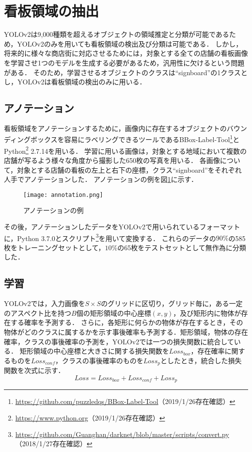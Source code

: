 \section{看板領域の抽出}
  YOLOv2は9,000種類を超えるオブジェクトの領域推定と分類が可能であるため，YOLOv2のみを用いても看板領域の検出及び分類は可能である．
  しかし，将来的に様々な商店街に対応させるためには，対象とする全ての店舗の看板画像を学習させ1つのモデルを生成する必要があるため，汎用性に欠けるという問題がある．
  そのため，学習させるオブジェクトのクラスは``signboard''の1クラスとし，YOLOv2は看板領域の検出のみに用いる．
  \subsection{アノテーション}
    看板領域をアノテーションするために，画像内に存在するオブジェクトのバウンディングボックスを容易にラベリングできるツールであるBBox-Label-Tool\footnote{\url{https://github.com/puzzledqs/BBox-Label-Tool}（2019/1/26存在確認）}とPython\footnote{\url{https://www.python.org}（2019/1/26存在確認）} 2.7.14を用いる．
    学習に用いる画像は，対象とする地域において複数の店舗が写るよう様々な角度から撮影した650枚の写真を用いる．
    各画像について，対象とする店舗の看板の左上と右下の座標，クラス``signboard''をそれぞれ人手でアノテーションした．
    アノテーションの例を図\ref{figure:annotation}に示す．
    \begin{figure}[tb]
      \centerline{\texttt{[image: annotation.png]}}
      \caption{アノテーションの例}
      \label{figure:annotation}
    \end{figure}
    その後，アノテーションしたデータをYOLOv2で用いられているフォーマットに，Python 3.7.0とスクリプト\footnote{\url{https://github.com/Guanghan/darknet/blob/master/scripts/convert.py}（2018/1/27存在確認）}を用いて変換する．
    これらのデータの$90\%$の585枚をトレーニングセットとして，$10\%$の65枚をテストセットとして無作為に分類した．
  \subsection{学習}
    YOLOv2では，入力画像を$S \times S$のグリッドに区切り，グリッド毎に，ある一定のアスペクト比を持つ$B$個の矩形領域の中心座標$(x, y)$，及び矩形内に物体が存在する確率を予測する．
    さらに，各矩形に何らかの物体が存在するとき，その物体がどのクラスに属するかを示す事後確率も予測する．矩形領域，物体の存在確率，クラスの事後確率の予測を，YOLOv2では一つの損失関数に統合している．
    矩形領域の中心座標と大きさに関する損失関数を$Loss_{box}$，存在確率に関するものを$Loss_{conf}$，クラスの事後確率のものを$Loss_{p}$としたとき，統合した損失関数を次式に示す．
    \begin{equation}
      Loss = Loss_{box} + Loss_{conf} + Loss_{p}
    \end{equation}

